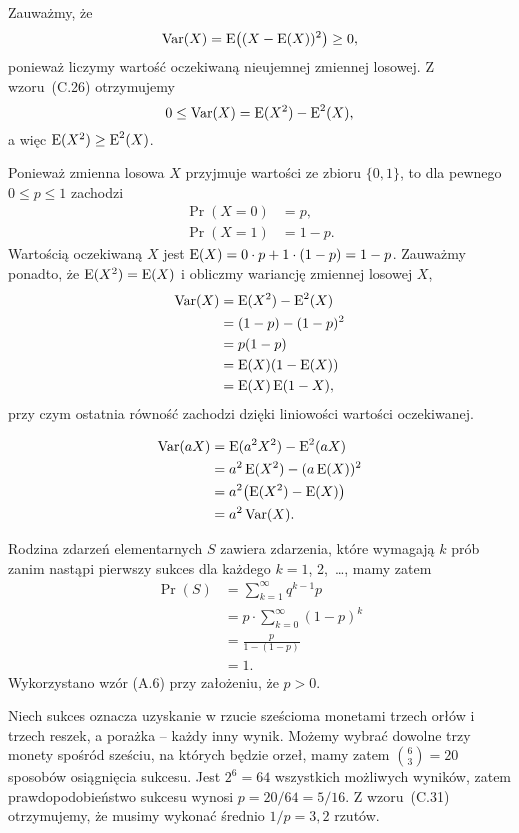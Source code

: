 \exercise{} %
\noindent Zauważmy, że
\[
	\operatorname{Var}(X) = \operatorname{E}\bigl((X-\operatorname{E}(X))^2\bigr) \ge 0,
\]
ponieważ liczymy wartość oczekiwaną nieujemnej zmiennej losowej. Z wzoru~(C.26) otrzymujemy
\[
	0 \le \operatorname{Var}(X) = \operatorname{E}(X^2)-\operatorname{E}^2(X),
\]
a więc $\operatorname{E}(X^2)\ge\operatorname{E}^2(X)$.

\exercise{} %
\noindent Ponieważ zmienna losowa $X$ przyjmuje wartości ze zbioru $\{0,1\}$, to dla pewnego $0\le p\le1$ zachodzi
\begin{align*}
	\Pr(X=0) &= p, \\
	\Pr(X=1) &= 1-p.
\end{align*}
Wartością oczekiwaną $X$ jest $\operatorname{E}(X)=0\cdot p+1\cdot(1-p)=1-p$. Zauważmy ponadto, że $\operatorname{E}(X^2)=\operatorname{E}(X)$ i obliczmy wariancję zmiennej losowej $X$,
\begin{align*}
	\operatorname{Var}(X) &= \operatorname{E}(X^2)-\operatorname{E}^2(X) \\
	&= (1-p)-(1-p)^2 \\
	&= p(1-p) \\
	&= \operatorname{E}(X)(1-\operatorname{E}(X)) \\
	&= \operatorname{E}(X)\operatorname{E}(1-X),
\end{align*}
przy czym ostatnia równość zachodzi dzięki liniowości wartości oczekiwanej.

\exercise{} %
\begin{align*}
	\operatorname{Var}(aX) &= \operatorname{E}(a^2X^2)-\operatorname{E}^2(aX) \\
	&= a^2\operatorname{E}(X^2)-(a\operatorname{E}(X))^2 \\
	&= a^2\bigl(\operatorname{E}(X^2)-\operatorname{E}(X)\bigr) \\
	&= a^2\operatorname{Var}(X).
\end{align*}

\exercise{} %
\noindent Rodzina zdarzeń elementarnych $S$ zawiera zdarzenia, które wymagają $k$ prób zanim nastąpi pierwszy sukces dla każdego $k=1$, 2,~\dots, mamy zatem
\begin{align*}
	\Pr(S) &= \sum_{k=1}^\infty q^{k-1}p \\
	&= p\cdot\sum_{k=0}^\infty (1-p)^k \\
	&= \frac{p}{1-(1-p)} \\[1mm]
	&= 1.
\end{align*}
Wykorzystano wzór (A.6) przy założeniu, że $p>0$.

\exercise{} %
\noindent Niech sukces oznacza uzyskanie w rzucie sześcioma monetami trzech orłów i trzech reszek, a porażka -- każdy inny wynik. Możemy wybrać dowolne trzy monety spośród sześciu, na których będzie orzeł, mamy zatem $\binom{6}{3}=20$ sposobów osiągnięcia sukcesu. Jest $2^6=64$ wszystkich możliwych wyników, zatem prawdopodobieństwo sukcesu wynosi $p=20/64=5/16$. Z wzoru~(C.31) otrzymujemy, że musimy wykonać średnio $1/p=3{,}2$ rzutów.

